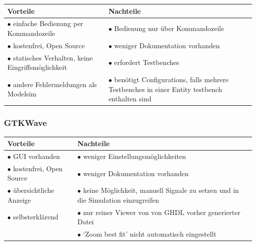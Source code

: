 \documentclass[a4paper, 11pt]{article}
\theoremstyle{definition}
\theoremstyle{plain}
\begin{document}
\begin{tabular}{p{7cm}|p{7cm}}
\textbf{Vorteile} & \textbf{Nachteile} \\
\hline 
$\bullet$ einfache Bedienung per Kommandozeile & $\bullet$ Bedienung nur über Kommandozeile \\
$\bullet$ kostenfrei, Open Source & $\bullet$ weniger Dokumentation vorhanden \\
$\bullet$ statisches Verhalten, keine Eingriffsmöglichkeit & $\bullet$ erfordert Testbenches \\
$\bullet$ andere Fehlermeldungen als Modelsim & $\bullet$ benötigt Configurations, falls mehrere Testbenches in einer Entity testbench enthalten sind
\end{tabular}

\subsubsection{GTKWave}

\begin{tabular}{p{7cm}|p{7cm}}
\textbf{Vorteile} & \textbf{Nachteile} \\
\hline 
$\bullet$ GUI vorhanden & $\bullet$ weniger Einstellungsmöglichkeiten \\
$\bullet$ kostenfrei, Open Source & $\bullet$ weniger Dokumentation vorhanden \\
$\bullet$ übersichtliche Anzeige & $\bullet$ keine Möglichkeit, manuell Signale zu setzen und in die Simulation einzugreifen \\
$\bullet$  selbsterklärend & $\bullet$ nur reiner Viewer von von GHDL vorher generierter Datei \\
 & $\bullet$ `Zoom best fit' nicht automatisch eingestellt
\end{tabular}
\end{document}
